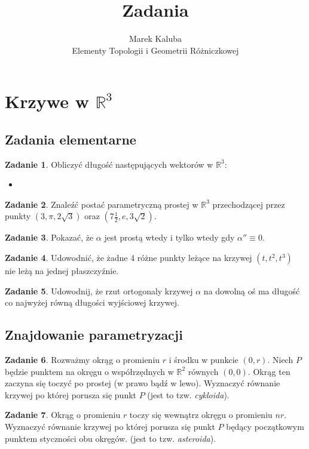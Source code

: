 \documentclass[a4paper,11pt]{article}
\title{Zadania}
\author{Marek Kaluba\\Elementy Topologii i Geometrii Różniczkowej}
\theoremstyle{definition}\newtheorem{exercise}{Zadanie}
\theoremstyle{definition}\newtheorem{remark}{Uwaga}
\begin{document}
\section{Krzywe w $\mathbb{R}^3$}

\subsection{Zadania elementarne}

\begin{exercise}
 Obliczyć długość następujących wektor\'ow w $\mathbb{R}^3$:
\begin{itemize}
 \item 
\end{itemize}
\end{exercise}

\begin{exercise}
Znaleźć postać parametryczną prostej  w $\mathbb{R}^3$ przechodzącej
przez punkty $(3,\pi,2\sqrt{3})$ oraz $(7\frac{1}{2},e,3\sqrt{2})$.
\end{exercise}

\begin{exercise}
Pokazać, że $\alpha$ jest prostą wtedy i tylko wtedy gdy $\alpha''\equiv 0$.
\end{exercise}

\begin{exercise}
Udowodnić, że żadne 4 różne punkty leżące na krzywej $(t,t^2,t^3)$ nie leżą 
na jednej płaszczyźnie.
\end{exercise}

\begin{exercise}
Udowodnij, że rzut ortogonaly krzywej $\alpha$ na dowolną oś ma długość co 
najwyżej równą długości wyjściowej krzywej.
\end{exercise}

\subsection{Znajdowanie parametryzacji}

\begin{exercise}
Rozważmy okrąg o promieniu $r$ i środku w punkcie $(0,r)$. Niech $P$ będzie 
punktem na okręgu o wsp\'ołrzędnych w $\mathbb{R}^2$ r\'ownych $(0,0)$. Okrąg 
ten zaczyna się toczyć po prostej (w prawo bądź w lewo). Wyznaczyć r\'ownanie 
krzywej po kt\'orej porusza się punkt $P$ (jest to tzw. \textit{cykloida}).
\end{exercise}

\begin{exercise}
Okrąg o promieniu $r$ toczy się wewnątrz okręgu o promieniu $nr$. Wyznaczyć 
r\'ownanie krzywej po kt\'orej porusza się punkt $P$ będący początkowym punktem 
styczności obu okręg\'ow. (jest to tzw. \textit{asteroida}).
\end{exercise}
\end{document}
